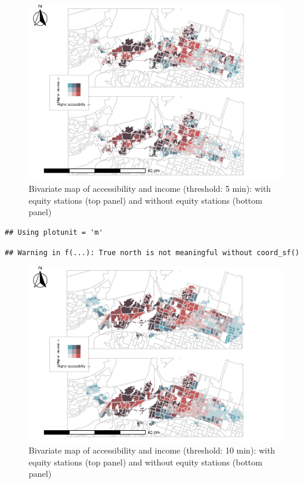 \documentclass[]{elsarticle} %
\begin{document}
\begin{figure}
\includegraphics[width=1\linewidth]{Bike-share-spatial-equity_files/figure-latex/figure-bi-map-threshold-5-1} \caption{\label{fig-bivariate-map-threshold-5}Bivariate map of accessibility and income (threshold: 5 min): with equity stations (top panel) and without equity stations (bottom panel)}\label{fig:figure-bi-map-threshold-5}
\end{figure}

\begin{verbatim}
## Using plotunit = 'm'
\end{verbatim}

\begin{verbatim}
## Warning in f(...): True north is not meaningful without coord_sf()
\end{verbatim}

\begin{figure}
\includegraphics[width=1\linewidth]{Bike-share-spatial-equity_files/figure-latex/figure-bi-map-threshold-10-1} \caption{\label{fig-bivariate-map-threshold-10}Bivariate map of accessibility and income (threshold: 10 min): with equity stations (top panel) and without equity stations (bottom panel)}\label{fig:figure-bi-map-threshold-10}
\end{figure}
\end{document}
